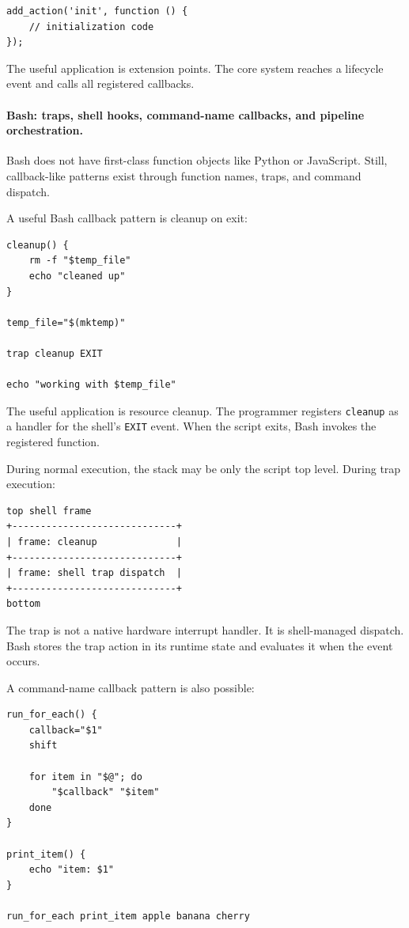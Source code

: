 \documentclass[a4paper,twoside]{report}
\begin{document}
\begin{verbatim}
add_action('init', function () {
    // initialization code
});
\end{verbatim}

The useful application is extension points. The core system reaches a lifecycle event and calls all registered callbacks.

\paragraph{Bash: traps, shell hooks, command-name callbacks, and pipeline orchestration.}

Bash does not have first-class function objects like Python or JavaScript. Still, callback-like patterns exist through function names, traps, and command dispatch.

A useful Bash callback pattern is cleanup on exit:

\begin{verbatim}
cleanup() {
    rm -f "$temp_file"
    echo "cleaned up"
}

temp_file="$(mktemp)"

trap cleanup EXIT

echo "working with $temp_file"
\end{verbatim}

The useful application is resource cleanup. The programmer registers \texttt{cleanup} as a handler for the shell's \texttt{EXIT} event. When the script exits, Bash invokes the registered function.

During normal execution, the stack may be only the script top level. During trap execution:

\begin{verbatim}
top shell frame
+-----------------------------+
| frame: cleanup              |
+-----------------------------+
| frame: shell trap dispatch  |
+-----------------------------+
bottom
\end{verbatim}

The trap is not a native hardware interrupt handler. It is shell-managed dispatch. Bash stores the trap action in its runtime state and evaluates it when the event occurs.

A command-name callback pattern is also possible:

\begin{verbatim}
run_for_each() {
    callback="$1"
    shift

    for item in "$@"; do
        "$callback" "$item"
    done
}

print_item() {
    echo "item: $1"
}

run_for_each print_item apple banana cherry
\end{verbatim}
\end{document}
